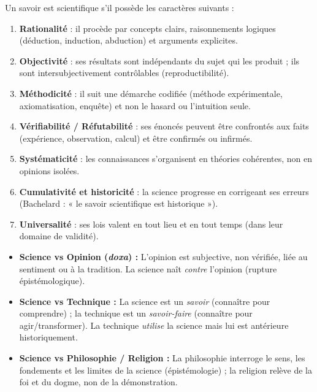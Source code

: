 \documentclass[11pt]{article}
\begin{document}
\begin{propriete}
Un savoir est scientifique s'il possède les caractères suivants :
\begin{enumerate}
\item \textbf{Rationalité} : il procède par concepts clairs, raisonnements logiques (déduction, induction, abduction) et arguments explicites.
\item \textbf{Objectivité} : ses résultats sont indépendants du sujet qui les produit ; ils sont intersubjectivement contrôlables (reproductibilité).
\item \textbf{Méthodicité} : il suit une démarche codifiée (méthode expérimentale, axiomatisation, enquête) et non le hasard ou l'intuition seule.
\item \textbf{Vérifiabilité / Réfutabilité} : ses énoncés peuvent être confrontés aux faits (expérience, observation, calcul) et être confirmés ou infirmés.
\item \textbf{Systématicité} : les connaissances s'organisent en théories cohérentes, non en opinions isolées.
\item \textbf{Cumulativité et historicité} : la science progresse en corrigeant ses erreurs (Bachelard : « le savoir scientifique est historique »).
\item \textbf{Universalité} : ses lois valent en tout lieu et en tout temps (dans leur domaine de validité).
\end{enumerate}
\end{propriete}

\begin{aretenir}
\begin{itemize}
\item \textbf{Science vs Opinion (\emph{doxa}) :} L'opinion est subjective, non vérifiée, liée au sentiment ou à la tradition. La science naît \emph{contre} l'opinion (rupture épistémologique).
\item \textbf{Science vs Technique :} La science est un \emph{savoir} (connaître pour comprendre) ; la technique est un \emph{savoir-faire} (connaître pour agir/transformer). La technique \emph{utilise} la science mais lui est antérieure historiquement.
\item \textbf{Science vs Philosophie / Religion :} La philosophie interroge le sens, les fondements et les limites de la science (épistémologie) ; la religion relève de la foi et du dogme, non de la démonstration.
\end{itemize}
\end{aretenir}
\end{document}
